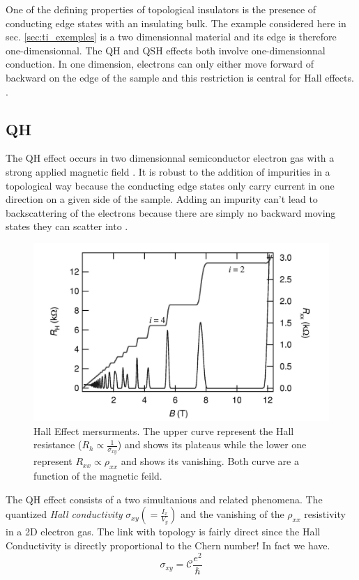 One of the defining properties of topological insulators is the presence of conducting edge states with an insulating bulk. The example considered here in sec. \ref{sec:ti_exemples} is a two dimensionnal material and its edge is therefore one-dimensionnal. The QH and QSH effects both involve one-dimensionnal conduction. In one dimension, electrons can only either move forward of backward on the edge of the sample and this restriction is central for Hall effects. \cite{qi_quantum_2010}. 
\subsection{QH}
The QH effect occurs in two dimensionnal semiconductor electron gas with a strong applied magnetic field \cite{qi_quantum_2010}. It is robust to the addition of impurities in a topological way because the conducting edge states only carry current in one direction on a given side of the sample. Adding an impurity can't lead to backscattering of the electrons because there are simply no backward moving states they can scatter into \cite{qi_quantum_2010}. 

\begin{figure}[h]
    \includegraphics[width=\columnwidth]{sections/visuel/Hall_effect.png}
    \caption{Hall Effect mersurments. The upper curve represent the Hall resistance ($R_h \propto \frac{1}{\sigma_{xy}}$) and shows its plateaus while the lower one represent $R_{xx} \propto \rho_{xx}$ and shows its vanishing. Both curve are a function of the magnetic feild. \cite{jeckelmann_quantum_nodate}}
    \label{fig:Hall_effet}
\end{figure}

The QH effect consists of a two simultanious and related phenomena. The quantized \textit{Hall conductivity} $\sigma_{xy}(=\frac{I_x}{V_y})$ and the vanishing of the $\rho_{xx}$ resistivity in a 2D electron gas. The link with topology is fairly direct since the Hall Conductivity is directly proportional to the Chern number! In fact we have.
\begin{equation}
\sigma_{xy} = \mathcal{C}\frac{e^2}{\hbar}
\end{equation}

